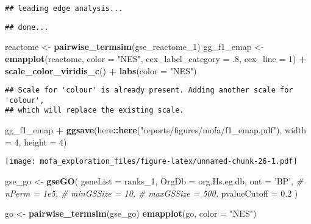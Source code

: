 \documentclass[
]{article}
\newenvironment{Shaded}{\begin{snugshade}}{\end{snugshade}}
\newcommand{\CommentTok}[1]{\textcolor[rgb]{0.56,0.35,0.01}{\textit{#1}}}
\newcommand{\DataTypeTok}[1]{\textcolor[rgb]{0.13,0.29,0.53}{#1}}
\newcommand{\DecValTok}[1]{\textcolor[rgb]{0.00,0.00,0.81}{#1}}
\newcommand{\FloatTok}[1]{\textcolor[rgb]{0.00,0.00,0.81}{#1}}
\newcommand{\KeywordTok}[1]{\textcolor[rgb]{0.13,0.29,0.53}{\textbf{#1}}}
\newcommand{\NormalTok}[1]{#1}
\newcommand{\OperatorTok}[1]{\textcolor[rgb]{0.81,0.36,0.00}{\textbf{#1}}}
\newcommand{\StringTok}[1]{\textcolor[rgb]{0.31,0.60,0.02}{#1}}
\begin{document}
\begin{verbatim}
## leading edge analysis...
\end{verbatim}

\begin{verbatim}
## done...
\end{verbatim}

\begin{Shaded}
\begin{Highlighting}[]
\NormalTok{reactome <-}\StringTok{ }\KeywordTok{pairwise_termsim}\NormalTok{(gse_reactome_}\DecValTok{1}\NormalTok{) }
\NormalTok{gg_f1_emap <-}\StringTok{ }\KeywordTok{emapplot}\NormalTok{(reactome, }\DataTypeTok{color =} \StringTok{"NES"}\NormalTok{,}
         \DataTypeTok{cex_label_category =} \FloatTok{.8}\NormalTok{,}
         \DataTypeTok{cex_line =} \DecValTok{1}\NormalTok{) }\OperatorTok{+}\StringTok{ }
\StringTok{  }\KeywordTok{scale_color_viridis_c}\NormalTok{() }\OperatorTok{+}\StringTok{ }
\StringTok{  }\KeywordTok{labs}\NormalTok{(}\DataTypeTok{color =} \StringTok{"NES"}\NormalTok{)}
\end{Highlighting}
\end{Shaded}

\begin{verbatim}
## Scale for 'colour' is already present. Adding another scale for 'colour',
## which will replace the existing scale.
\end{verbatim}

\begin{Shaded}
\begin{Highlighting}[]
\NormalTok{gg_f1_emap }\OperatorTok{+}\StringTok{ }
\StringTok{  }\KeywordTok{ggsave}\NormalTok{(here}\OperatorTok{::}\KeywordTok{here}\NormalTok{(}\StringTok{"reports/figures/mofa/f1_emap.pdf"}\NormalTok{), }\DataTypeTok{width =} \DecValTok{4}\NormalTok{, }\DataTypeTok{height =} \DecValTok{4}\NormalTok{)}
\end{Highlighting}
\end{Shaded}

\texttt{[image: mofa\_exploration\_files/figure-latex/unnamed-chunk-26-1.pdf]}

\begin{Shaded}
\begin{Highlighting}[]
\NormalTok{gse_go <-}\StringTok{ }\KeywordTok{gseGO}\NormalTok{(}
  \DataTypeTok{geneList =}\NormalTok{ ranks_}\DecValTok{1}\NormalTok{,}
  \DataTypeTok{OrgDb =}\NormalTok{ org.Hs.eg.db,}
  \DataTypeTok{ont =} \StringTok{'BP'}\NormalTok{,}
  \CommentTok{# nPerm = 1e5,}
  \CommentTok{# minGSSize = 10,}
  \CommentTok{# maxGSSize = 500,}
  \DataTypeTok{pvalueCutoff =} \FloatTok{0.2}
\NormalTok{)}

\NormalTok{go <-}\StringTok{ }\KeywordTok{pairwise_termsim}\NormalTok{(gse_go) }
\KeywordTok{emapplot}\NormalTok{(go, }\DataTypeTok{color =} \StringTok{"NES"}\NormalTok{)}
\end{Highlighting}
\end{Shaded}
\end{document}
